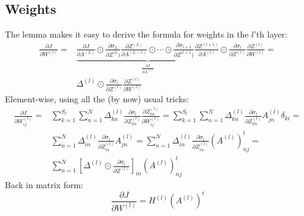 \documentclass[12pt, a4paper]{article}
\numberwithin{equation}{section}
\begin{document}
\subsection{Weights}
The lemma makes it easy to derive the formula for weights in the $l$'th layer:
\begin{align}
\frac{\partial J}{\partial W^{(l)}}=&\underbrace{\frac{\partial J}{\partial A^{(L)}}\odot\frac{\partial\sigma_L}{\partial Z^{(L})}\frac{\partial Z^{(L)}}{\partial A^{(L-1)}}\odot\cdots\odot\frac{\partial\sigma_{l+1}}{\partial Z^{(l+1})}\frac{\partial Z^{(l+1)}}{\partial A^{(l)}}}_{\frac{\partial J}{\partial A^{(l)}}}\odot\frac{\partial\sigma_l}{\partial Z^{(l)}}\frac{\partial Z^{(l)}}{\partial W^{(l)}}=\\
&\Delta^{(l)}\odot\frac{\partial\sigma_l}{\partial Z^{(l)}}\frac{\partial Z^{(l)}}{\partial W^{(l)}}
\end{align}
Element-wise, using all the (by now) usual tricks:
\begin{align}
\frac{\partial J}{\partial W^{(l)}_{ij}}=&\sum_{k=1}^{S_l}\sum_{n=1}^N\Delta^{(l)}_{kn}\frac{\partial\sigma_l}{\partial Z^{(l)}_{kn}}\frac{\partial Z^{(l)}_{kn}}{\partial W^{(l)}_{ij}}=\sum_{k=1}^{S_l}\sum_{n=1}^N\Delta^{(l)}_{kn}\frac{\partial\sigma_l}{\partial Z^{(l)}_{kn}}A^{(l)}_{jn}\delta_{ki}=\\
&\sum_{n=1}^N\Delta^{(l)}_{in}\frac{\partial\sigma_l}{\partial Z^{(l)}_{in}}A^{(l)}_{jn}=\sum_{n=1}^N\Delta^{(l)}_{in}\frac{\partial\sigma_l}{\partial Z^{(l)}_{in}}\left(A^{(l)}\right)^t_{nj}=\\
&\sum_{n=1}^N\left[\Delta^{(l)}\odot\frac{\partial\sigma_l}{\partial Z^{(l)}}\right]_{in}\left(A^{(l)}\right)^t_{nj}
\end{align}
Back in matrix form:
\begin{equation}
\frac{\partial J}{\partial W^{(l)}}=H^{(l)}\left(A^{(l)}\right)^t
\end{equation}
\end{document}
